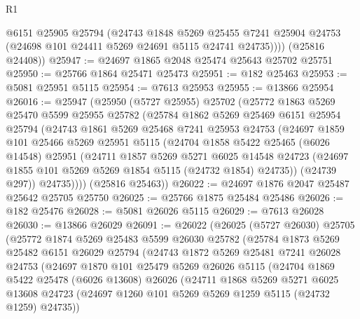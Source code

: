 \begin{lexlean}{R1}
\begin{coremodule}
          @6151
          @25905
          @25794
          (@24743
            @1848
            @5269
            @25455
            @7241
            @25904
            @24753
            (@24698 @101 @24411 @5269 @24691 @5115 @24741 @24735))))
      (@25816 @24408))
@25947 := @24697 @1865 @2048 @25474 @25643 @25702 @25751
@25950 := @25766 @1864 @25471 @25473
@25951 := @182 @25463
@25953 := @5081 @25951 @5115
@25954 := @7613 @25953
@25955 := @13866 @25954
@26016 := @25947
    (@25950
      (@5727 @25955)
      @25702
      (@25772
        @1863
        @5269
        @25470
        @5599
        @25955
        @25782
        (@25784
          @1862
          @5269
          @25469
          @6151
          @25954
          @25794
          (@24743
            @1861
            @5269
            @25468
            @7241
            @25953
            @24753
            (@24697
              @1859
              @101
              @25466
              @5269
              @25951
              @5115
              (@24704
                @1858
                @5422
                @25465
                (@6026 @14548)
                @25951
                (@24711
                  @1857
                  @5269
                  @5271
                  @6025
                  @14548
                  @24723
                  (@24697 @1855 @101 @5269 @5269 @1854 @5115 (@24732 @1854) @24735))
                (@24739 @297))
              @24735))))
      (@25816 @25463))
@26022 := @24697 @1876 @2047 @25487 @25642 @25705 @25750
@26025 := @25766 @1875 @25484 @25486
@26026 := @182 @25476
@26028 := @5081 @26026 @5115
@26029 := @7613 @26028
@26030 := @13866 @26029
@26091 := @26022
    (@26025
      (@5727 @26030)
      @25705
      (@25772
        @1874
        @5269
        @25483
        @5599
        @26030
        @25782
        (@25784
          @1873
          @5269
          @25482
          @6151
          @26029
          @25794
          (@24743
            @1872
            @5269
            @25481
            @7241
            @26028
            @24753
            (@24697
              @1870
              @101
              @25479
              @5269
              @26026
              @5115
              (@24704
                @1869
                @5422
                @25478
                (@6026 @13608)
                @26026
                (@24711
                  @1868
                  @5269
                  @5271
                  @6025
                  @13608
                  @24723
                  (@24697 @1260 @101 @5269 @5269 @1259 @5115 (@24732 @1259) @24735))

\end{coremodule}
\end{lexlean}
